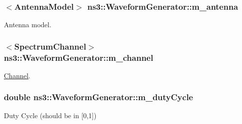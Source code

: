 \subsubsection[{\texorpdfstring{m\+\_\+antenna}{m_antenna}}]{$<${\bf Antenna\+Model}$>$ ns3\+::\+Waveform\+Generator\+::m\+\_\+antenna\hspace{0.3cm}{\ttfamily [private]}}\hypertarget{classns3_1_1WaveformGenerator_a36a1f3e3b98042b688d5f75aece0783a}{}\label{classns3_1_1WaveformGenerator_a36a1f3e3b98042b688d5f75aece0783a}


Antenna model. 

\subsubsection[{\texorpdfstring{m\+\_\+channel}{m_channel}}]{$<${\bf Spectrum\+Channel}$>$ ns3\+::\+Waveform\+Generator\+::m\+\_\+channel\hspace{0.3cm}{\ttfamily [private]}}\hypertarget{classns3_1_1WaveformGenerator_a509629fc4f14bfa2088aa2333201d4f3}{}\label{classns3_1_1WaveformGenerator_a509629fc4f14bfa2088aa2333201d4f3}


\hyperlink{classns3_1_1Channel}{Channel}. 

\subsubsection[{\texorpdfstring{m\+\_\+duty\+Cycle}{m_dutyCycle}}]{\setlength{\rightskip}{0pt plus 5cm}double ns3\+::\+Waveform\+Generator\+::m\+\_\+duty\+Cycle\hspace{0.3cm}{\ttfamily [private]}}\hypertarget{classns3_1_1WaveformGenerator_ae82f38f37abe89a657c3e1d789f10ce0}{}\label{classns3_1_1WaveformGenerator_ae82f38f37abe89a657c3e1d789f10ce0}


Duty Cycle (should be in \mbox{[}0,1\mbox{]}) 

